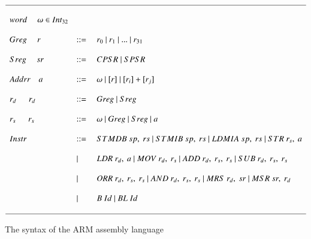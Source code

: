 \documentclass[conference]{IEEEtran}
\begin{document}
\begin{figure*}
\begin{displaymath}
\begin{array}{l l l}
\hline\\
word~~~~~\omega \in Int_{32} \\ \\
Greg~~~~~r &::=&~r_0~|~r_1~|~...~|~r_{31} \\ \\
Sreg~~~~~sr &::=&~CPSR~|~SPSR \\ \\
Addrr~~~~a &::=&~\omega~|~[r]~|~[r_i]+[r_j] \\ \\
r_d~~~~~~r_d &::=&~Greg~|~Sreg\\ \\
r_s~~~~~~r_s &::=&~\omega~|~Greg~|~Sreg~|~a \\ \\
Instr &::=&~STMDB~sp,~rs~|~STMIB~sp,~rs~|~LDMIA~sp,~rs~|~STR~r_s,~a\\ \\&|&~LDR~r_d,~a~|~MOV~r_d,~r_s~|~ADD~r_d,~r_s,~r_s~|~SUB~r_d,~r_s,~r_s\\ \\&|&~ORR~r_d,~r_s,~r_s~|~AND~r_d,~r_s,~r_s~|~MRS~r_d,~sr~|~MSR~sr,~r_d\\ \\&|&~B~Id~|~BL~Id\\ \\
\hline

\end{array}
\end{displaymath}
\caption{The syntax of the ARM assembly language}
\label{arm-syntax}
\end{figure*}
\end{document}
